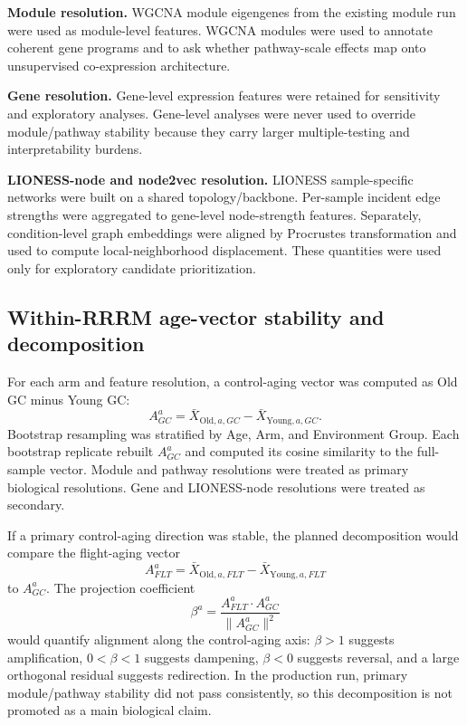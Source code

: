 \documentclass[11pt]{article}
\begin{document}
\textbf{Module resolution.} WGCNA module eigengenes from the existing module run were used as module-level features. WGCNA modules were used to annotate coherent gene programs and to ask whether pathway-scale effects map onto unsupervised co-expression architecture.

\textbf{Gene resolution.} Gene-level expression features were retained for sensitivity and exploratory analyses. Gene-level analyses were never used to override module/pathway stability because they carry larger multiple-testing and interpretability burdens.

\textbf{LIONESS-node and node2vec resolution.} LIONESS sample-specific networks were built on a shared topology/backbone. Per-sample incident edge strengths were aggregated to gene-level node-strength features. Separately, condition-level graph embeddings were aligned by Procrustes transformation and used to compute local-neighborhood displacement. These quantities were used only for exploratory candidate prioritization.

\subsection{Within-RRRM age-vector stability and decomposition}

For each arm and feature resolution, a control-aging vector was computed as Old GC minus Young GC:
\begin{equation}
A^a_{GC}=\bar{X}_{\mathrm{Old},a,GC}-\bar{X}_{\mathrm{Young},a,GC}.
\end{equation}
Bootstrap resampling was stratified by Age, Arm, and Environment Group. Each bootstrap replicate rebuilt $A^a_{GC}$ and computed its cosine similarity to the full-sample vector. Module and pathway resolutions were treated as primary biological resolutions. Gene and LIONESS-node resolutions were treated as secondary.

If a primary control-aging direction was stable, the planned decomposition would compare the flight-aging vector
\begin{equation}
A^a_{FLT}=\bar{X}_{\mathrm{Old},a,FLT}-\bar{X}_{\mathrm{Young},a,FLT}
\end{equation}
to $A^a_{GC}$. The projection coefficient
\begin{equation}
\beta^a = \frac{A^a_{FLT}\cdot A^a_{GC}}{\lVert A^a_{GC}\rVert^2}
\end{equation}
would quantify alignment along the control-aging axis: $\beta>1$ suggests amplification, $0<\beta<1$ suggests dampening, $\beta<0$ suggests reversal, and a large orthogonal residual suggests redirection. In the production run, primary module/pathway stability did not pass consistently, so this decomposition is not promoted as a main biological claim.
\end{document}
